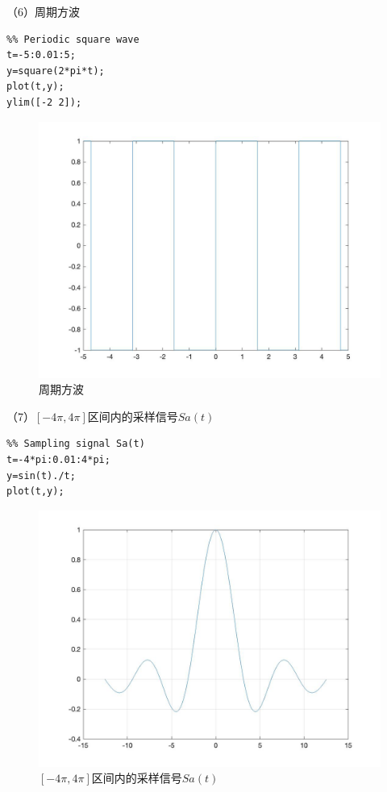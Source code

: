 \documentclass[a4paper,12pt]{ctexart}
\begin{document}
（6）周期方波
\begin{lstlisting}
%% Periodic square wave
t=-5:0.01:5;
y=square(2*pi*t);
plot(t,y);
ylim([-2 2]);
\end{lstlisting}
\begin{figure}[H]
    \centering
    \includegraphics[width=14cm]{7.jpg}
    \caption{周期方波}
\end{figure}

（7）$[-4\pi,4\pi]$区间内的采样信号$Sa(t)$
\begin{lstlisting}
%% Sampling signal Sa(t)
t=-4*pi:0.01:4*pi;
y=sin(t)./t;
plot(t,y);
\end{lstlisting}
\begin{figure}[H]
    \centering
    \includegraphics[width=14cm]{8.jpg}
    \caption{$[-4\pi,4\pi]$区间内的采样信号$Sa(t)$}
\end{figure}
\end{document}
